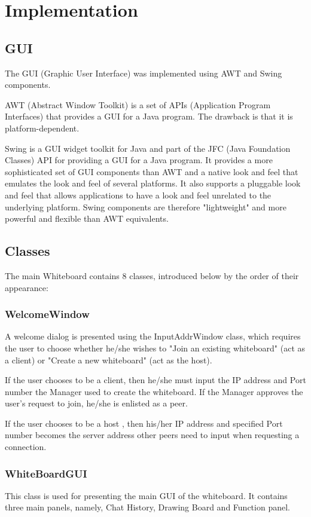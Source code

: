 \chapter{Implementation}
\section{GUI}
The GUI (Graphic User Interface) was implemented using AWT and Swing components.

\noindent AWT (Abstract Window Toolkit) is a set of APIs (Application Program Interfaces) that provides a GUI for a Java program. The drawback is that it is platform-dependent.

\noindent Swing is a GUI widget toolkit for Java and part of the JFC (Java Foundation Classes) API for providing a GUI for a Java program. It provides a more sophisticated set of GUI components than AWT and a native look and feel that emulates the look and feel of several platforms. It also supports a pluggable look and feel that allows applications to have a look and feel unrelated to the underlying platform. Swing components are therefore "lightweight" and more powerful and flexible than AWT equivalents.
\section{Classes}
The main Whiteboard contains 8 classes, introduced below by the order of their appearance:
\subsection{WelcomeWindow}
A welcome dialog is presented using the InputAddrWindow class, which requires the user to choose whether he/she wishes to "Join an existing whiteboard" (act as a client) or "Create a new whiteboard" (act as the host).

\noindent If the user chooses to be a client, then he/she must input the IP address and Port number the Manager used to create the whiteboard. If the Manager approves the user's request to join, he/she is enlisted as a peer.

\noindent If the user chooses to be a host , then his/her IP address and specified Port number becomes the server address other peers need to input when requesting a connection. 
\subsection{WhiteBoardGUI}
This class is used for presenting the main GUI of the whiteboard. It contains three main panels, namely, Chat History, Drawing Board and Function panel.

